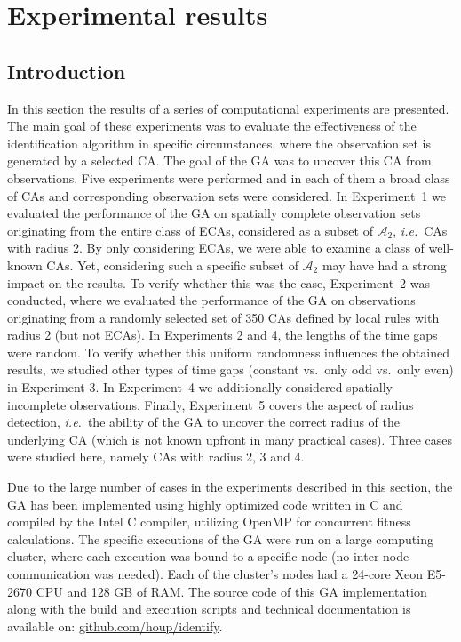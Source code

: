 \section{Experimental results}\label{sec:experiments}%
\subsection{Introduction}
In this section the results of a series of computational experiments are presented. The main goal of these experiments was to evaluate the effectiveness of the identification algorithm in specific circumstances, where the observation set is generated by a selected CA. The goal of the GA was to uncover this CA from observations. Five experiments were performed and in each of them a broad class of CAs and corresponding observation sets were considered. In Experiment~1 we evaluated the performance of the GA on spatially complete observation sets originating from the entire class of ECAs, considered as a subset of $\mathcal{A}_2$, \emph{i.e.}\ CAs with radius 2. By only considering ECAs, we were able to examine a class of well-known CAs. Yet, considering such a specific subset of $\mathcal{A}_2$ may have had a strong impact on the results. To verify whether this was the case, Experiment~2 was conducted, where we evaluated the performance of the GA on observations originating from a randomly selected set of 350 CAs defined by local rules with radius 2 (but not ECAs). In Experiments 2 and 4, the lengths of the time gaps were random. To verify whether this uniform randomness influences the obtained results, we studied other types of time gaps (constant vs.\ only odd vs.\ only even) in Experiment 3. In Experiment~4 we additionally considered spatially incomplete observations. Finally, Experiment~5 covers the aspect of radius detection, \emph{i.e.}\ the ability of the GA to uncover the correct radius of the underlying CA (which is not known upfront in many practical cases). Three cases were studied here, namely CAs with radius 2, 3 and 4.

Due to the large number of cases in the experiments described in this section, the GA has been implemented using highly optimized code written in C and compiled by the Intel C compiler, utilizing OpenMP for concurrent fitness calculations. The specific executions of the GA were run on a large computing cluster, where each execution was bound to a specific node (no inter-node communication was needed). Each of the cluster's nodes had a 24-core Xeon E5-2670 CPU and 128 GB of RAM. The source code of this GA implementation along with the build and execution scripts and technical documentation is available on: \href{https://github.com/houp/identify}{github.com/houp/identify}.

